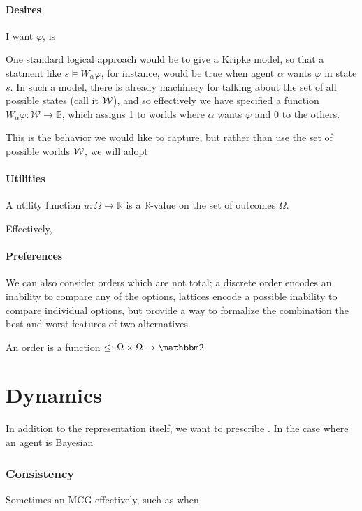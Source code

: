 \documentclass{article}
\begin{document}
	\subsection{Desires}
	
	I want $\varphi$, is 
	
	One standard logical approach would be to give a Kripke model, so that a statment like $s \vDash W_{\alpha} \varphi$, for instance, would be true when agent $\alpha$ wants $\varphi$ in state $s$. In such a model, there is already machinery for talking about the set of all possible states (call it $\cal W$), and so effectively we have specified a function $W_\alpha \varphi: \mathcal W \to \mathbb B$, which assigns 1 to worlds where $\alpha$ wants $\varphi$ and 0 to the others.
	
	This is the behavior we would like to capture, but rather than use the set of possible worlds $\cal W$, we will adopt 
	
	
	\subsection{Utilities}
	
		
	
	A utility function $u : \Omega \to \mathbb R$ is a $\mathbb R$-value on the set of outcomes $\Omega$. 
	
	Effectively, 

	
	\subsection{Preferences}
	We can also consider orders which are not total; a discrete order encodes an inability to compare any of the options, lattices encode a possible inability to compare individual options, but provide a way to formalize the combination the best and worst features of two alternatives.
	
	
	An order is a function $\leq: \Omega \times \Omega \to \mathbbm 2$
	
	\part{Dynamics}
	In addition to the representation itself, we want to prescribe . 
	In the case where an agent is Bayesian 
	
	\section{Consistency}
	Sometimes an MCG effectively, such as when 
%	
	
\end{document}
